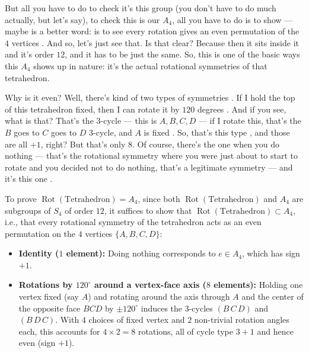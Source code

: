 \begin{proofWrapper}[Proof that \texorpdfstring{$\operatorname{Rot}(\text{Tetrahedron}) = A_4$}{Rot(Tetrahedron) = A\_4}]

\begin{speech}[00:41:16 - 00:43:02]
But all you have to do to check it's this group (you don't have to do much actually, but let's say), to check this is our $A_4$, all you have to do is to show --- maybe  is a better word: is to see every rotation gives an even permutation of the $4$ vertices . And so, let's just see that. Is that clear? Because then it sits inside it and it's order $12$, and it has to be just the same. So, this is one of the basic ways this $A_4$ shows up in nature: it's the actual rotational symmetries of that tetrahedron.

Why is it even? Well, there's kind of two types of symmetries . If I hold the top of this tetrahedron fixed, then I can rotate it by $120$ degrees . And if you see, what is that? That's the $3$-cycle --- this is $A, B, C, D$ --- if I rotate this, that's the $B$ goes to $C$ goes to $D$ $3$-cycle, and $A$ is fixed . So, that's this type , and those are all $+1$, right? But that's only $8$. Of course, there's the one when you do nothing --- that's the rotational symmetry where you were just about to start to rotate and you decided not to do nothing, that's a legitimate symmetry --- and it's this one .
\end{speech}

\begin{content}
To prove $\operatorname{Rot}(\text{Tetrahedron}) = A_4$, since both $\operatorname{Rot}(\text{Tetrahedron})$ and $A_4$ are subgroups of $S_4$ of order $12$, it suffices to show that $\operatorname{Rot}(\text{Tetrahedron}) \subset A_4$, i.e., that every rotational symmetry of the tetrahedron acts as an even permutation on the $4$ vertices $\{A, B, C, D\}$:
\begin{itemize}
    \item \textbf{Identity ($1$ element):} Doing nothing corresponds to $e \in A_4$, which has sign $+1$.
    \item \textbf{Rotations by $120^\circ$ around a vertex-face axis ($8$ elements):} Holding one vertex fixed (say $A$) and rotating around the axis through $A$ and the center of the opposite face $BCD$ by $\pm 120^\circ$ induces the $3$-cycles $(B\,C\,D)$ and $(B\,D\,C)$. With $4$ choices of fixed vertex and $2$ non-trivial rotation angles each, this accounts for $4 \times 2 = 8$ rotations, all of cycle type $3+1$ and hence even (sign $+1$).
\end{itemize}
\end{content}


\end{proofWrapper}

